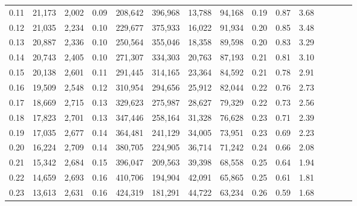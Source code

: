\begin{tabular}{rrrcrrrrrrrrrrr}
0.11 &  21,173 &  2,002 &                                       0.09 &  208,642 &  396,968 &   13,788 &   94,168 &  0.19 &  0.87 &                         3.68 \\
0.12 &  21,035 &  2,234 &                                       0.10 &  229,677 &  375,933 &   16,022 &   91,934 &  0.20 &  0.85 &                         3.48 \\
0.13 &  20,887 &  2,336 &                                       0.10 &  250,564 &  355,046 &   18,358 &   89,598 &  0.20 &  0.83 &                         3.29 \\
0.14 &  20,743 &  2,405 &                                       0.10 &  271,307 &  334,303 &   20,763 &   87,193 &  0.21 &  0.81 &                         3.10 \\
0.15 &  20,138 &  2,601 &                                       0.11 &  291,445 &  314,165 &   23,364 &   84,592 &  0.21 &  0.78 &                         2.91 \\
0.16 &  19,509 &  2,548 &                                       0.12 &  310,954 &  294,656 &   25,912 &   82,044 &  0.22 &  0.76 &                         2.73 \\
0.17 &  18,669 &  2,715 &                                       0.13 &  329,623 &  275,987 &   28,627 &   79,329 &  0.22 &  0.73 &                         2.56 \\
0.18 &  17,823 &  2,701 &                                       0.13 &  347,446 &  258,164 &   31,328 &   76,628 &  0.23 &  0.71 &                         2.39 \\
0.19 &  17,035 &  2,677 &                                       0.14 &  364,481 &  241,129 &   34,005 &   73,951 &  0.23 &  0.69 &                         2.23 \\
0.20 &  16,224 &  2,709 &                                       0.14 &  380,705 &  224,905 &   36,714 &   71,242 &  0.24 &  0.66 &                         2.08 \\
0.21 &  15,342 &  2,684 &                                       0.15 &  396,047 &  209,563 &   39,398 &   68,558 &  0.25 &  0.64 &                         1.94 \\
0.22 &  14,659 &  2,693 &                                       0.16 &  410,706 &  194,904 &   42,091 &   65,865 &  0.25 &  0.61 &                         1.81 \\
0.23 &  13,613 &  2,631 &                                       0.16 &  424,319 &  181,291 &   44,722 &   63,234 &  0.26 &  0.59 &                         1.68 \\

\end{tabular}
